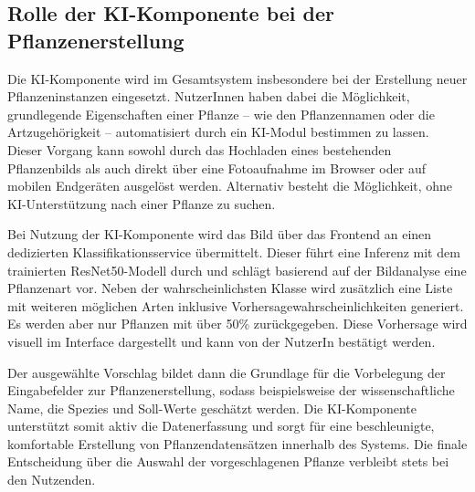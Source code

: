 \subsection{Rolle der KI-Komponente bei der Pflanzenerstellung}

Die KI-Komponente wird im Gesamtsystem insbesondere bei der Erstellung neuer Pflanzeninstanzen eingesetzt. NutzerInnen haben dabei die Möglichkeit, grundlegende Eigenschaften einer Pflanze – wie den Pflanzennamen oder die Artzugehörigkeit – automatisiert durch ein KI-Modul bestimmen zu lassen. Dieser Vorgang kann sowohl durch das Hochladen eines bestehenden Pflanzenbilds als auch direkt über eine Fotoaufnahme im Browser oder auf mobilen Endgeräten ausgelöst werden. Alternativ besteht die Möglichkeit, ohne KI-Unterstützung nach einer Pflanze zu suchen.

Bei Nutzung der KI-Komponente wird das Bild über das Frontend an einen dedizierten Klassifikationsservice übermittelt. Dieser führt eine Inferenz mit dem trainierten \ac{ResNet50}-Modell durch und schlägt basierend auf der Bildanalyse eine Pflanzenart vor. Neben der wahrscheinlichsten Klasse wird zusätzlich eine Liste mit weiteren möglichen Arten inklusive Vorhersagewahrscheinlichkeiten generiert. Es werden aber nur Pflanzen mit über 50\% zurückgegeben. Diese Vorhersage wird visuell im Interface dargestellt und kann von der NutzerIn  bestätigt werden.

Der ausgewählte Vorschlag bildet dann die Grundlage für die Vorbelegung der Eingabefelder zur Pflanzenerstellung, sodass beispielsweise der wissenschaftliche Name, die Spezies und Soll-Werte geschätzt werden. Die KI-Komponente unterstützt somit aktiv die Datenerfassung und sorgt für eine beschleunigte, komfortable Erstellung von Pflanzendatensätzen innerhalb des Systems. Die finale Entscheidung über die Auswahl der vorgeschlagenen Pflanze verbleibt stets bei den Nutzenden.

